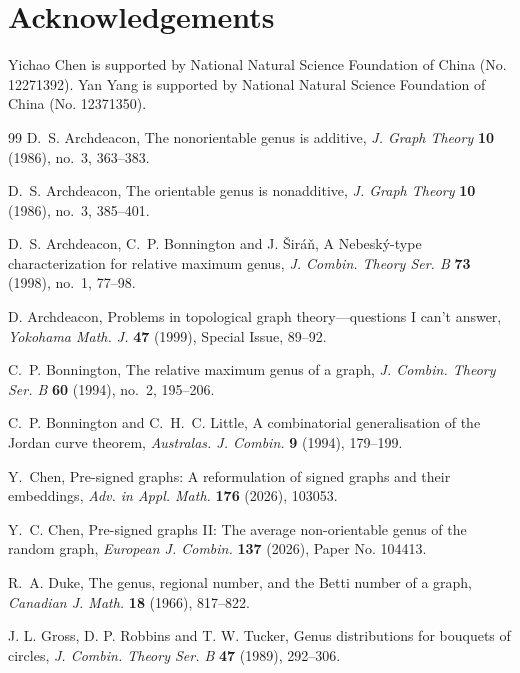 \documentclass[12pt]{article}
\theoremstyle{definition}
\begin{document}
\section*{Acknowledgements}

Yichao Chen is supported by National Natural Science Foundation of China  (No. 12271392). Yan Yang is supported by
National Natural Science Foundation of China (No. 12371350).


\begin{thebibliography}{99}
\frenchspacing
{}
D.~S. Archdeacon, The nonorientable genus is additive, \emph{J. Graph Theory} {\bf 10} (1986), no.~3, 363--383.

D.~S. Archdeacon, The orientable genus is nonadditive, \emph{J. Graph Theory} {\bf 10} (1986), no.~3, 385--401.

D.~S. Archdeacon, C.~P. Bonnington and J. \v Sir\'a\v n, A Nebesk\'y-type characterization for relative maximum genus, \emph{J. Combin. Theory Ser. B} {\bf 73} (1998), no.~1, 77--98.

D. Archdeacon,
Problems in topological graph theory---questions I can't answer,
\emph{Yokohama Math. J.} \textbf{47} (1999), Special Issue, 89--92.

C.~P. Bonnington, The relative maximum genus of a graph, \emph{J. Combin. Theory Ser. B} {\bf 60} (1994), no.~2, 195--206.

C.~P. Bonnington and C.~H.~C. Little, A combinatorial generalisation of the Jordan curve theorem, \emph{Australas. J. Combin.} {\bf 9} (1994), 179--199.


Y.~Chen, Pre-signed graphs: A reformulation of signed graphs and their embeddings, \emph{Adv. in Appl. Math.} \textbf{176} (2026), 103053.

Y.~C. Chen, Pre-signed graphs II: The average non-orientable genus of the random graph, \emph{European J. Combin.} {\bf 137} (2026), Paper No. 104413.

R.~A. Duke,
The genus, regional number, and the Betti number of a graph,
\emph{Canadian J. Math.} \textbf{18} (1966),
817--822.


J. L. Gross, D. P. Robbins and T. W. Tucker,
Genus distributions for bouquets of circles,
\emph{J. Combin. Theory Ser. B} \textbf{47} (1989), 292--306.



\end{thebibliography}
\end{document}
